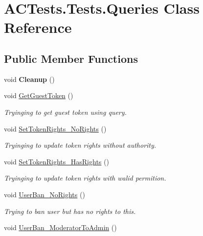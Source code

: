 \hypertarget{class_a_c_tests_1_1_tests_1_1_queries}{}\section{A\+C\+Tests.\+Tests.\+Queries Class Reference}
\label{class_a_c_tests_1_1_tests_1_1_queries}
\subsection*{Public Member Functions}
\begin{DoxyCompactItemize}
\item 
\mbox{\label{class_a_c_tests_1_1_tests_1_1_queries_aad4293b7fc65633fe27c3e4d8ea98e18}} 
void {\bfseries Cleanup} ()
\item 
void \mbox{\hyperlink{class_a_c_tests_1_1_tests_1_1_queries_a4ed741a79a3952ed1f7570085527f338}{Get\+Guest\+Token}} ()
\begin{DoxyCompactList}\small\item\em Tryinging to get guest token using query. \end{DoxyCompactList}\item 
void \mbox{\hyperlink{class_a_c_tests_1_1_tests_1_1_queries_a12b2f9a235bdbb914b693f30cf9a5800}{Set\+Token\+Rights\+\_\+\+No\+Rights}} ()
\begin{DoxyCompactList}\small\item\em Tryinging to update token rights without authority. \end{DoxyCompactList}\item 
void \mbox{\hyperlink{class_a_c_tests_1_1_tests_1_1_queries_a3960f1ab51e343168f23590ef058599a}{Set\+Token\+Rights\+\_\+\+Has\+Rights}} ()
\begin{DoxyCompactList}\small\item\em Tryinging to update token rights with walid permition. \end{DoxyCompactList}\item 
void \mbox{\hyperlink{class_a_c_tests_1_1_tests_1_1_queries_a13c440cfccaf9a8494769e03131fdddd}{User\+Ban\+\_\+\+No\+Rights}} ()
\begin{DoxyCompactList}\small\item\em Trying to ban user but has no rights to this. \end{DoxyCompactList}\item 
void \mbox{\hyperlink{class_a_c_tests_1_1_tests_1_1_queries_a52e89a0d9a88f7db6a4631f91aa7a2a0}{User\+Ban\+\_\+\+Moderator\+To\+Admin}} ()

\end{DoxyCompactItemize}
